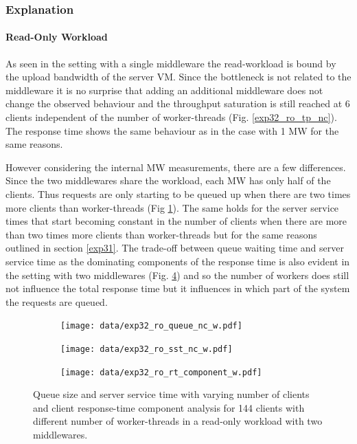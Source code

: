 \documentclass[report.tex]{subfiles}
\begin{document}
\subsubsection{Explanation}

\paragraph{Read-Only Workload}

As seen in the setting with a single middleware the read-workload is bound by the upload bandwidth of the server VM. Since the bottleneck is not related to the middleware it is no surprise that adding an additional middleware does not change the observed behaviour and the throughput saturation is still reached at 6 clients independent of the number of worker-threads (Fig. \ref{exp32_ro_tp_nc}). The response time shows the same behaviour as in the case with 1 MW for the same reasons.

However considering the internal MW measurements, there are a few differences.
Since the two middlewares share the workload, each MW has only half of the clients.
Thus requests are only starting to be queued up when there are two times more clients than worker-threads (Fig \ref{exp32_ro_q}).
The same holds for the server service times that start becoming constant in the number of clients when there are more than two times more clients than worker-threads but for the same reasons outlined in section \ref{exp31}. 
The trade-off between queue waiting time and server service time as the dominating components of the response time is also evident in the setting with two middlewares (Fig. \ref{exp32_ro_rtcomp}) and so the number of workers does still not influence the total response time but it influences in which part of the system the requests are queued.

\begin{figure}[H]
	\begin{subfigure}[b]{.33\linewidth}
		\centering
		\texttt{[image: data/exp32\_ro\_queue\_nc\_w.pdf]}
		\caption{}\label{exp32_ro_q}
	\end{subfigure}\hfill
	\begin{subfigure}[b]{.33\linewidth}
		\centering
		\texttt{[image: data/exp32\_ro\_sst\_nc\_w.pdf]}
		\caption{}\label{exp32_ro_sst}
	\end{subfigure}\hfill
	\begin{subfigure}[b]{.33\linewidth}
		\centering
		\texttt{[image: data/exp32\_ro\_rt\_component\_w.pdf]}
		\caption{}\label{exp32_ro_rtcomp}
	\end{subfigure}
	\caption{Queue size and server service time with varying number of clients and client response-time component analysis for 144 clients with different number of worker-threads in a read-only workload with two middlewares.}
\end{figure}
\end{document}
